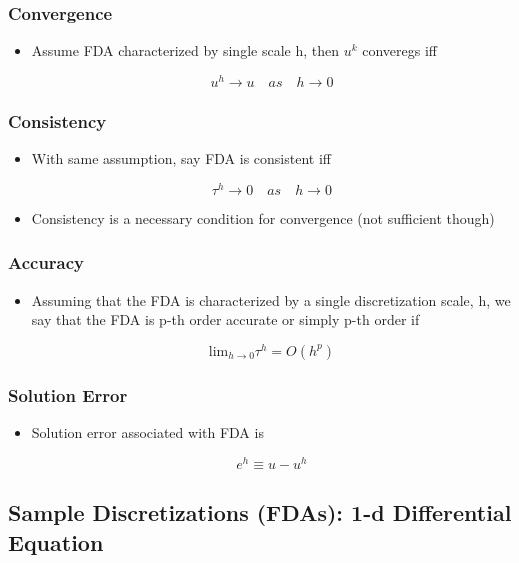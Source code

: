 \subsubsection{Convergence}
\begin{itemize}
    \item Assume FDA characterized by single scale h, then $u^k$ converegs iff

    \[ u^h \rightarrow u \quad as \quad h\rightarrow0\]
\end{itemize}

\subsubsection{Consistency}

\begin{itemize}
    \item With same assumption, say FDA is consistent iff

    \[ \tau^h \rightarrow 0 \quad as \quad h\rightarrow 0\]

    \item Consistency is a necessary condition for convergence (not sufficient though) 
\end{itemize}

\subsubsection{Accuracy}

\begin{itemize}
    \item Assuming that the FDA is characterized by a single discretization scale, h, we say that the FDA is p-th order
    accurate or simply p-th order if

    \[ \text{lim}_{h\rightarrow0} \tau^h = O(h^p)\]
\end{itemize}

\subsubsection{Solution Error}

\begin{itemize}
    \item Solution error associated with FDA is

    \[ e^h \equiv u - u^h\]
    
\end{itemize}

\subsection{Sample Discretizations (FDAs): 1-d Differential Equation}

